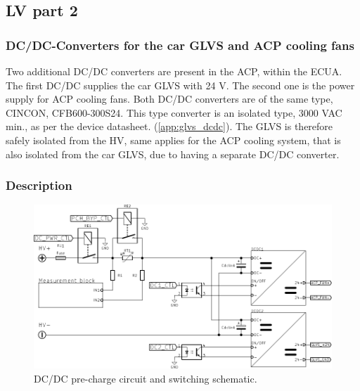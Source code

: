\subsection{LV part 2}

\subsubsection {DC/DC-Converters for the car GLVS and ACP cooling fans}
Two additional DC/DC converters are present in the ACP, within the ECUA. The first DC/DC supplies the car GLVS with 24 V. The second one is the power supply for ACP cooling fans. Both DC/DC converters are of the same type, CINCON, CFB600-300S24. This type converter is an isolated type, 3000 VAC min., as per the device datasheet. (\ref{app:glvs_dcdc}). The GLVS is therefore safely isolated from the HV, same applies for the ACP cooling system, that is also isolated from the car GLVS, due to having a separate DC/DC converter.

\subsubsection{Description}

\begin{figure}[H]
	\centering
	\includegraphics[width=\textwidth,clip]{./img/ECUA_DCDC_PRECHARGE.pdf}
	\caption{DC/DC pre-charge circuit and switching schematic.}
	\label{fig:precharge_dcdc_sch}
\end{figure}

